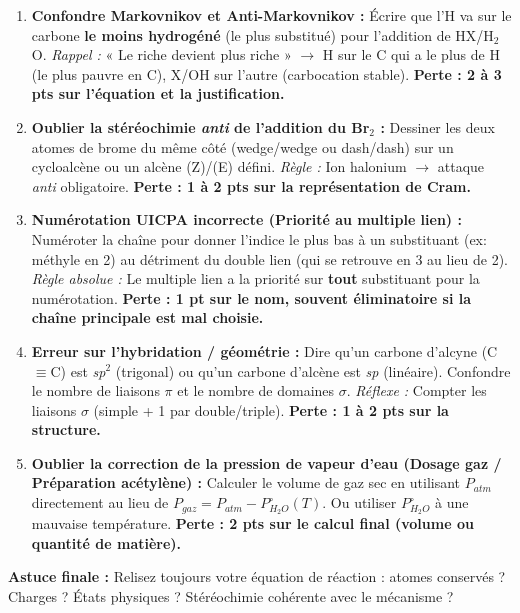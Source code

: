\documentclass[11pt]{article}
\begin{document}
\begin{attention}
\begin{enumerate}
    \item \textbf{Confondre Markovnikov et Anti-Markovnikov :} Écrire que l'H va sur le carbone \textbf{le moins hydrogéné} (le plus substitué) pour l'addition de HX/H$_2$O. \textit{Rappel :} « Le riche devient plus riche » $\rightarrow$ H sur le C qui a le plus de H (le plus pauvre en C), X/OH sur l'autre (carbocation stable). \textbf{Perte : 2 à 3 pts sur l'équation et la justification.}
    
    \item \textbf{Oublier la stéréochimie \textit{anti} de l'addition du Br$_2$ :} Dessiner les deux atomes de brome du même côté (wedge/wedge ou dash/dash) sur un cycloalcène ou un alcène (Z)/(E) défini. \textit{Règle :} Ion halonium $\rightarrow$ attaque \textit{anti} obligatoire. \textbf{Perte : 1 à 2 pts sur la représentation de Cram.}
    
    \item \textbf{Numérotation UICPA incorrecte (Priorité au multiple lien) :} Numéroter la chaîne pour donner l'indice le plus bas à un substituant (ex: méthyle en 2) au détriment du double lien (qui se retrouve en 3 au lieu de 2). \textit{Règle absolue :} Le multiple lien a la priorité sur \textbf{tout} substituant pour la numérotation. \textbf{Perte : 1 pt sur le nom, souvent éliminatoire si la chaîne principale est mal choisie.}
    
    \item \textbf{Erreur sur l'hybridation / géométrie :} Dire qu'un carbone d'alcyne (C$\equiv$C) est \textit{sp}$^2$ (trigonal) ou qu'un carbone d'alcène est \textit{sp} (linéaire). Confondre le nombre de liaisons $\pi$ et le nombre de domaines $\sigma$. \textit{Réflexe :} Compter les liaisons $\sigma$ (simple + 1 par double/triple). \textbf{Perte : 1 à 2 pts sur la structure.}
    
    \item \textbf{Oublier la correction de la pression de vapeur d'eau (Dosage gaz / Préparation acétylène) :} Calculer le volume de gaz sec en utilisant $P_{atm}$ directement au lieu de $P_{gaz} = P_{atm} - P_{H_2O}^\circ(T)$. Ou utiliser $P_{H_2O}^\circ$ à une mauvaise température. \textbf{Perte : 2 pts sur le calcul final (volume ou quantité de matière).}
\end{enumerate}
\textbf{Astuce finale :} Relisez toujours votre équation de réaction : atomes conservés ? Charges ? États physiques ? Stéréochimie cohérente avec le mécanisme ?
\end{attention}
\end{document}
